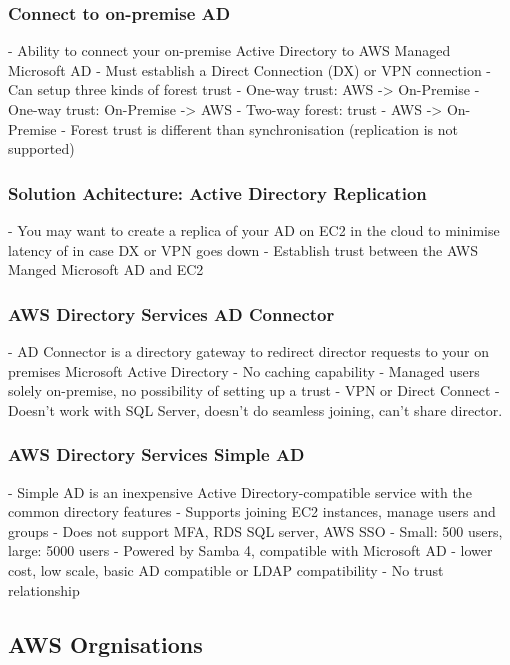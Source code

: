 \documentclass[11pt]{book}
\begin{document}
    \subsubsection{Connect to on-premise AD}
    - Ability to connect your on-premise Active Directory to AWS Managed Microsoft AD
    - Must establish a Direct Connection (DX) or VPN connection
    - Can setup three kinds of forest trust
    - One-way trust: AWS -> On-Premise
    - One-way trust: On-Premise -> AWS
    - Two-way forest: trust - AWS -> On-Premise
    - Forest trust is different than synchronisation (replication is not supported)

    \subsubsection{Solution Achitecture: Active Directory Replication}
    - You may want to create a replica of your AD on EC2 in the cloud to minimise latency of in case DX or VPN goes down
    - Establish trust between the AWS Manged Microsoft AD and EC2

    \subsubsection{AWS Directory Services AD Connector}
    - AD Connector is a directory gateway to redirect director requests to your on premises Microsoft Active Directory
    - No caching capability
    - Managed users solely on-premise, no possibility of setting up a trust
    - VPN or Direct Connect
    - Doesn't work with SQL Server, doesn't do seamless joining, can't share director.

    \subsubsection{AWS Directory Services Simple AD}
    - Simple AD is an inexpensive Active Directory-compatible service with the common directory features
    - Supports joining EC2 instances, manage users and groups
    - Does not support MFA, RDS SQL server, AWS SSO
    - Small: 500 users, large: 5000 users
    - Powered by Samba 4, compatible with Microsoft AD
    - lower cost, low scale, basic AD compatible or LDAP compatibility
    - No trust relationship

    \subsection{AWS Orgnisations}
\end{document}
